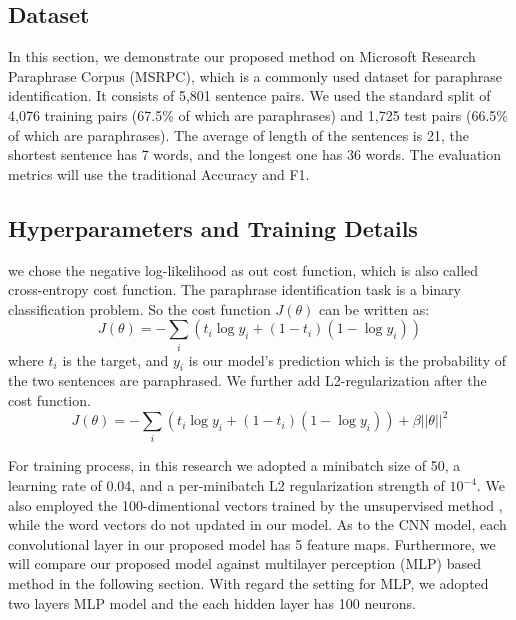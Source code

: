 \documentclass[conference]{IEEEtran}
\begin{document}
\subsection{Dataset}
In this section, we demonstrate our proposed method on Microsoft Research Paraphrase Corpus (MSRPC), which is a commonly used dataset for paraphrase identification. It consists of 5,801 sentence pairs. We used the standard split of 4,076 training pairs (67.5\% of which are paraphrases) and 1,725 test pairs (66.5\% of which are paraphrases). The average of length of the sentences is 21, the shortest sentence has 7 words, and the longest one has 36 words. The evaluation metrics will use the traditional Accuracy and F1.

\subsection{Hyperparameters and Training Details}
we chose the negative log-likelihood as out cost function, which is also called cross-entropy cost function. The paraphrase identification task is a binary classification problem. So the cost function $J(\theta)$ can be written as:
\begin{equation}
J(\theta) = -\sum_{i} (t_i \log y_i + (1-t_i)(1- \log y_i))
\end{equation}
where $t_i$ is the target, and $y_i$ is our model’s prediction which is the probability of the two sentences are paraphrased. We further add L2-regularization after the cost function.
\begin{equation}
J(\theta) = -\sum_{i} (t_i \log y_i + (1-t_i)(1- \log y_i)) + \beta || \theta ||^2
\end{equation}

For training process, in this research we adopted a minibatch size of 50, a learning rate of 0.04, and a per-minibatch L2 regularization strength of $10^{-4}$. We also employed the 100-dimentional vectors trained by the unsupervised method \cite{DBLP:conf/icml/CollobertW08}, while the word vectors do not updated in our model. As to the CNN model, each convolutional layer in our proposed model has 5 feature maps. Furthermore, we will compare our proposed model against multilayer perception (MLP) based method in the following section. With regard the setting for MLP, we adopted two layers MLP model and the each hidden layer has 100 neurons.
\end{document}
